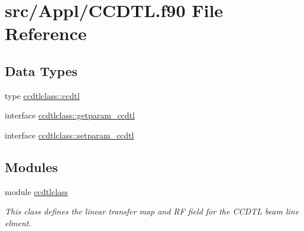 \hypertarget{_c_c_d_t_l_8f90}{}\section{src/\+Appl/\+C\+C\+D\+TL.f90 File Reference}
\label{_c_c_d_t_l_8f90}
\subsection*{Data Types}
\begin{DoxyCompactItemize}
\item 
type \mbox{\hyperlink{namespaceccdtlclass_structccdtlclass_1_1ccdtl}{ccdtlclass\+::ccdtl}}
\item 
interface \mbox{\hyperlink{interfaceccdtlclass_1_1getparam__ccdtl}{ccdtlclass\+::getparam\+\_\+ccdtl}}
\item 
interface \mbox{\hyperlink{interfaceccdtlclass_1_1setparam__ccdtl}{ccdtlclass\+::setparam\+\_\+ccdtl}}
\end{DoxyCompactItemize}
\subsection*{Modules}
\begin{DoxyCompactItemize}
\item 
module \mbox{\hyperlink{namespaceccdtlclass}{ccdtlclass}}
\begin{DoxyCompactList}\small\item\em This class defines the linear transfer map and RF field for the C\+C\+D\+TL beam line elment. \end{DoxyCompactList}\end{DoxyCompactItemize}
